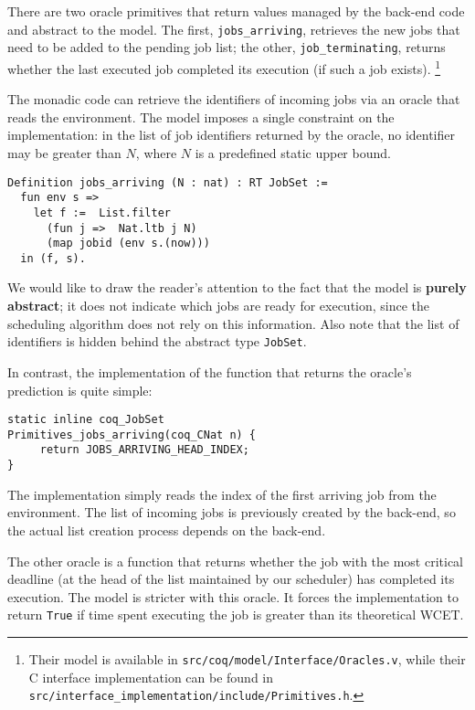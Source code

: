 	There are two oracle primitives that return values managed by the back-end code and abstract to the model. The first, \texttt{jobs\_arriving}, retrieves the new jobs that need to be added to the pending job list; the other, \texttt{job\_terminating}, returns whether the last executed job completed its execution (if such a job exists). \footnote{Their model is available in \texttt{src/coq/model/Interface/Oracles.v}, while their C interface implementation can be found in \texttt{src/interface\_implementation/include/Primitives.h}.}

	The monadic code can retrieve the identifiers of incoming jobs via an oracle that reads the environment. The model imposes a single constraint on the implementation: in the list of job identifiers returned by the oracle, no identifier may be greater than $N$, where $N$ is a predefined static upper bound. 

	\begin{verbatim}
Definition jobs_arriving (N : nat) : RT JobSet :=
  fun env s =>
    let f :=  List.filter
      (fun j =>  Nat.ltb j N)
      (map jobid (env s.(now))) 
  in (f, s).
	\end{verbatim}

	We would like to draw the reader's attention to the fact that the model is \textbf{purely abstract}; it does not indicate which jobs are ready for execution, since the scheduling algorithm does not rely on this information. Also note that the list of identifiers is hidden behind the abstract type \texttt{JobSet}.

	In contrast, the implementation of the function that returns the oracle's prediction is quite simple:

	\begin{verbatim}
static inline coq_JobSet
Primitives_jobs_arriving(coq_CNat n) {
     return JOBS_ARRIVING_HEAD_INDEX;
}
	\end{verbatim}

	The implementation simply reads the index of the first arriving job from the environment. The list of incoming jobs is previously created by the back-end, so the actual list creation process depends on the back-end.

	The other oracle is a function that returns whether the job with the most critical deadline (at the head of the list maintained by our scheduler) has completed its execution. The model is stricter with this oracle. It forces the implementation to return \texttt{True} if time spent executing the job is greater than its theoretical WCET.

